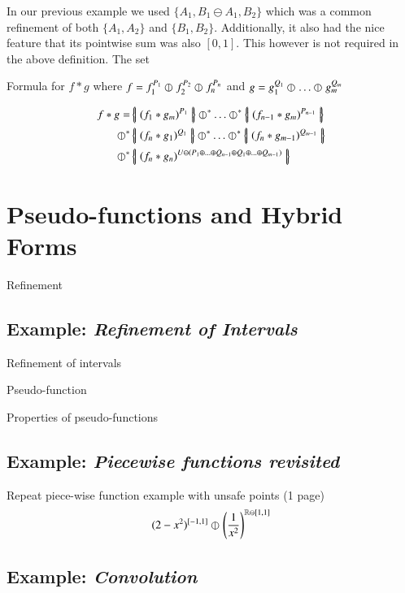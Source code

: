 In our previous example we used $\{ A_1, B_1 \ominus A_1, B_2 \}$ which was a common refinement of both
$\{ A_1, A_2 \}$ and $\{ B_1, B_2 \}$.
Additionally, it also had the nice feature that its pointwise sum was also $[0,1]$.
This however is not required in the above definition.
The set 

Formula for $f*g$ where $f = f_1^{P_1} \varobar^{} f_2^{P_2} \varobar^{} f_n^{P_n}$ and $g = g_1^{Q_1} \varobar^{} \ldots \varobar^{} g_m^{Q_m}$

\begin{align*}
f*g = & \hset{ (f_1 * g_m)^{P_1} } \hjoin[*] \ldots \hjoin[*] \hset{ (f_{n-1} * g_m)^{P_{n-1}}} \\ \hjoin[*]
& \hset{ (f_n * g_1)^{Q_1} } \hjoin[*] \ldots \hjoin[*] \hset{ (f_n * g_{m-1})^{Q_{m-1}}} \\ \hjoin[*]
&\hset{ (f_n * g_n)^{U \ominus (P_1 \oplus \ldots \oplus Q_{n-1} \oplus Q_1 \oplus \ldots \oplus Q_{m-1})}}
\end{align*}



\section{Pseudo-functions and Hybrid Forms}
\begin{definition}
Refinement
\end{definition}

\subsection{Example: \emph{Refinement of Intervals}}
Refinement of intervals

\begin{definition}
Pseudo-function
\end{definition}

Properties of pseudo-functions


\subsection{Example: \emph{Piecewise functions revisited}}
Repeat piece-wise function example with unsafe points (1 page)
\begin{equation}
(2-x^2)^{[-1,1]} \varobar^{} \left( \frac{1}{x^2} \right)^{\mathbb{R} \ominus [1,1]}
\end{equation}

\subsection{Example: \emph{Convolution}}

